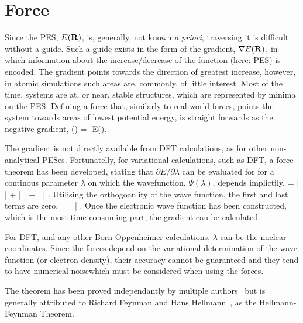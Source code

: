 \section{Force}
\label{sec:force}
Since the PES, $E({\mathrm{\mathbf{\bm{R}}}})$, is, generally, not known \textit{a priori}, traversing it is difficult without a guide.
Such a guide exists in the form of the gradient, $\nabla E({\mathrm{\mathbf{\bm{R}}}})$, in which information about the increase/decrease of the function (here: PES) is encoded.
The gradient points towards the direction of greatest increase, however, in atomic simulations such areas are, commonly, of little interest.
Most of the time, systems are at, or near, stable structures, which are represented by minima on the PES.
Defining a force that, similarly to real world forces, points the system towards areas of lowest potential energy, is straight forwards as the negative gradient,
\vF(\vR) = -\nabla E(\vR).
\eeq

The gradient is not directly available from DFT calculations, as for other non-analytical PESes.
Fortunatelly, for variational calculations, such as DFT, a force theorem has been developed, stating that $\partial E / \partial\lambda$ can be evaluated for for a continous parameter $\lambda$ on which the wavefunction, $\Psi(\lambda)$, depends implictily,
 = 
\bra \frac{\partial \Psi}{\partial \lambda} |  | \Psi \ket +
\bra \Psi |  | \Psi \ket +
\bra \Psi |  | \frac{\partial \Psi}{\partial \lambda} \ket.
\eeq
Utilising the orthogoanlity of the wave function, the first and last terms are zero, 
 = \bra \Psi |  | \Psi \ket.
\eeq
Once the electronic wave function has been constructed, which is the most time consuming part, the gradient can be calculated.

For DFT, and any other Born-Oppenheimer calculations, $\lambda$ can be the nuclear coordinates. 
Since the forces depend on the variational determination of the wave function (or electron density), their accuracy cannot be guaranteed and they tend to have numerical noise\citemiss which must be considered when using the forces.

The theorem has been proved independantly by multiple authors~\cite{forces-pauli-1933, forces-guttinger-1932} but is generally attributed to Richard Feynman\cite{forces-feynman-1939} and Hans Hellmann~\cite{forces-hellmann-1937}, as the Hellmann-Feynman Theorem.
